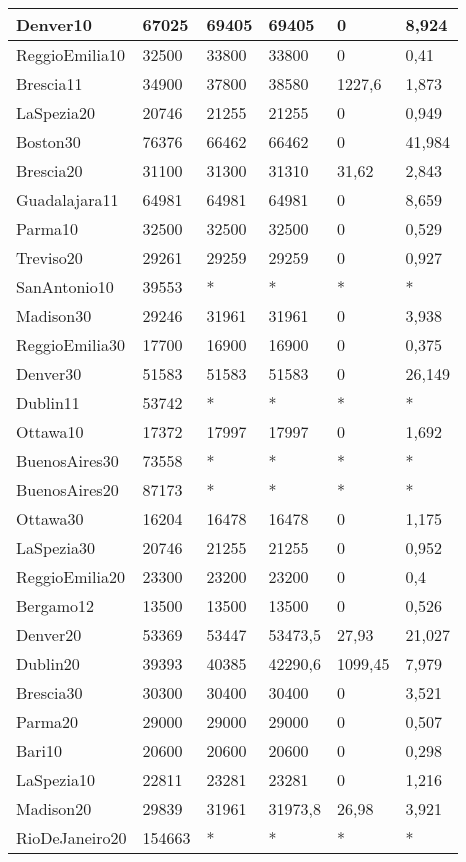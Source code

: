 \begin{longtable}[c]{|l|l|l|l|l|l|}
Denver10 & 67025 & 69405 & 69405 & 0 & 8,924 \\ \hline
ReggioEmilia10 & 32500 & 33800 & 33800 & 0 & 0,41 \\ \hline
Brescia11 & 34900 & 37800 & 38580 & 1227,6 & 1,873 \\ \hline
LaSpezia20 & 20746 & 21255 & 21255 & 0 & 0,949 \\ \hline
Boston30 & 76376 & 66462 & 66462 & 0 & 41,984 \\ \hline
Brescia20 & 31100 & 31300 & 31310 & 31,62 & 2,843 \\ \hline
Guadalajara11 & 64981 & 64981 & 64981 & 0 & 8,659 \\ \hline
Parma10 & 32500 & 32500 & 32500 & 0 & 0,529 \\ \hline
Treviso20 & 29261 & 29259 & 29259 & 0 & 0,927 \\ \hline
SanAntonio10 & 39553 & * & * & * & * \\ \hline
Madison30 & 29246 & 31961 & 31961 & 0 & 3,938 \\ \hline
ReggioEmilia30 & 17700 & 16900 & 16900 & 0 & 0,375 \\ \hline
Denver30 & 51583 & 51583 & 51583 & 0 & 26,149 \\ \hline
Dublin11 & 53742 & * & * & * & * \\ \hline
Ottawa10 & 17372 & 17997 & 17997 & 0 & 1,692 \\ \hline
BuenosAires30 & 73558 & * & * & * & * \\ \hline
BuenosAires20 & 87173 & * & * & * & * \\ \hline
Ottawa30 & 16204 & 16478 & 16478 & 0 & 1,175 \\ \hline
LaSpezia30 & 20746 & 21255 & 21255 & 0 & 0,952 \\ \hline
ReggioEmilia20 & 23300 & 23200 & 23200 & 0 & 0,4 \\ \hline
Bergamo12 & 13500 & 13500 & 13500 & 0 & 0,526 \\ \hline
Denver20 & 53369 & 53447 & 53473,5 & 27,93 & 21,027 \\ \hline
Dublin20 & 39393 & 40385 & 42290,6 & 1099,45 & 7,979 \\ \hline
Brescia30 & 30300 & 30400 & 30400 & 0 & 3,521 \\ \hline
Parma20 & 29000 & 29000 & 29000 & 0 & 0,507 \\ \hline
Bari10 & 20600 & 20600 & 20600 & 0 & 0,298 \\ \hline
LaSpezia10 & 22811 & 23281 & 23281 & 0 & 1,216 \\ \hline
Madison20 & 29839 & 31961 & 31973,8 & 26,98 & 3,921 \\ \hline
RioDeJaneiro20 & 154663 & * & * & * & * \\ \hline
\end{longtable}

